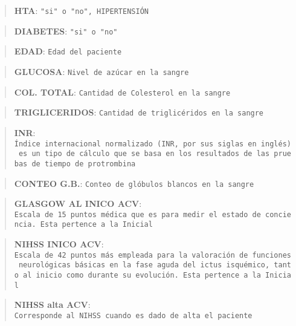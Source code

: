     \begin{quote}
\textbf{HTA}: \texttt{"si"\ o\ "no",\ HIPERTENSIÓN}
\end{quote}

\begin{quote}
\textbf{DIABETES}: \texttt{"si"\ o\ "no"}
\end{quote}

\begin{quote}
\textbf{EDAD}: \texttt{Edad\ del\ paciente}
\end{quote}

\begin{quote}
\textbf{GLUCOSA}: \texttt{Nivel\ de\ azúcar\ en\ la\ sangre}
\end{quote}

\begin{quote}
\textbf{COL. TOTAL}: \texttt{Cantidad\ de\ Colesterol\ en\ la\ sangre}
\end{quote}

\begin{quote}
\textbf{TRIGLICERIDOS}:
\texttt{Cantidad\ de\ triglicéridos\ en\ la\ sangre}
\end{quote}

\begin{quote}
\textbf{INR}:
\texttt{Índice\ internacional\ normalizado\ (INR,\ por\ sus\ siglas\ en\ inglés)\ es\ un\ tipo\ de\ cálculo\ que\ se\ basa\ en\ los\ resultados\ de\ las\ pruebas\ de\ tiempo\ de\ protrombina}
\end{quote}

\begin{quote}
\textbf{CONTEO G.B.}:
\texttt{Conteo\ de\ glóbulos\ blancos\ en\ la\ sangre}
\end{quote}

\begin{quote}
\textbf{GLASGOW AL INICO ACV}:
\texttt{Escala\ de\ 15\ puntos\ médica\ que\ es\ para\ medir\ el\ estado\ de\ conciencia.\ Esta\ pertence\ a\ la\ Inicial}
\end{quote}

\begin{quote}
\textbf{NIHSS INICO ACV}:
\texttt{Escala\ de\ 42\ puntos\ más\ empleada\ para\ la\ valoración\ de\ funciones\ neurológicas\ básicas\ en\ la\ fase\ aguda\ del\ ictus\ isquémico,\ tanto\ al\ inicio\ como\ durante\ su\ evolución.\ Esta\ pertence\ a\ la\ Inicial}
\end{quote}

\begin{quote}
\textbf{NIHSS alta ACV}:
\texttt{Corresponde\ al\ NIHSS\ cuando\ es\ dado\ de\ alta\ el\ paciente}
\end{quote}

